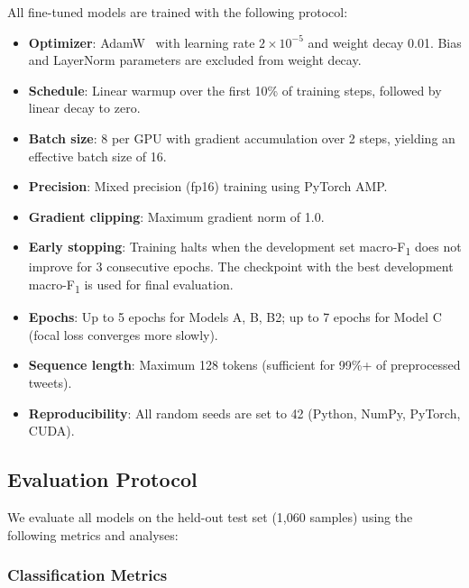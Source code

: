 \documentclass[10pt,a4paper]{article}
\newcommand{\fone}{macro-F\textsubscript{1}}
\begin{document}
All fine-tuned models are trained with the following protocol:
\begin{itemize}[leftmargin=*,itemsep=1pt]
    \item \textbf{Optimizer}: AdamW~\citep{loshchilov2019adamw} with learning rate $2 \times 10^{-5}$ and weight decay 0.01. Bias and LayerNorm parameters are excluded from weight decay.
    \item \textbf{Schedule}: Linear warmup over the first 10\% of training steps, followed by linear decay to zero.
    \item \textbf{Batch size}: 8 per GPU with gradient accumulation over 2 steps, yielding an effective batch size of 16.
    \item \textbf{Precision}: Mixed precision (fp16) training using PyTorch AMP.
    \item \textbf{Gradient clipping}: Maximum gradient norm of 1.0.
    \item \textbf{Early stopping}: Training halts when the development set \fone{} does not improve for 3 consecutive epochs. The checkpoint with the best development \fone{} is used for final evaluation.
    \item \textbf{Epochs}: Up to 5 epochs for Models A, B, B2; up to 7 epochs for Model C (focal loss converges more slowly).
    \item \textbf{Sequence length}: Maximum 128 tokens (sufficient for 99\%+ of preprocessed tweets).
    \item \textbf{Reproducibility}: All random seeds are set to 42 (Python, NumPy, PyTorch, CUDA).
\end{itemize}

\subsection{Evaluation Protocol}
\label{sec:eval_protocol}

We evaluate all models on the held-out test set (1,060 samples) using the following metrics and analyses:

\subsubsection{Classification Metrics}
\end{document}
